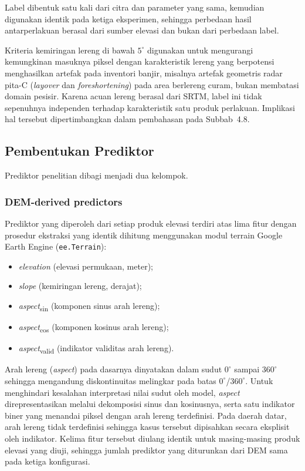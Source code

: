 \documentclass[12pt]{article}
\begin{document}
Label dibentuk satu kali dari citra dan parameter yang sama, kemudian
digunakan identik pada ketiga eksperimen, sehingga perbedaan hasil
antarperlakuan berasal dari sumber elevasi dan bukan dari perbedaan label.

Kriteria kemiringan lereng di bawah $5^{\circ}$ digunakan untuk mengurangi
kemungkinan masuknya piksel dengan karakteristik lereng yang berpotensi
menghasilkan artefak pada inventori banjir, misalnya artefak geometris
radar pita-C (\textit{layover} dan \textit{foreshortening}) pada area
berlereng curam, bukan membatasi domain pesisir.
Karena acuan lereng berasal dari SRTM, label ini tidak sepenuhnya independen
terhadap karakteristik satu produk perlakuan. Implikasi hal tersebut
dipertimbangkan dalam pembahasan pada Subbab~4.8.

\subsection{Pembentukan Prediktor}

Prediktor penelitian dibagi menjadi dua kelompok.

\subsubsection{DEM-derived predictors}

Prediktor yang diperoleh dari setiap produk elevasi terdiri atas lima fitur
dengan prosedur ekstraksi yang identik dihitung menggunakan modul terrain
Google Earth Engine (\texttt{ee.Terrain}):

\begin{itemize}
\item \textit{elevation} (elevasi permukaan, meter);
\item \textit{slope} (kemiringan lereng, derajat);
\item \textit{aspect}\textsubscript{sin} (komponen sinus arah lereng);
\item \textit{aspect}\textsubscript{cos} (komponen kosinus arah lereng);
\item \textit{aspect}\textsubscript{valid} (indikator validitas arah lereng).
\end{itemize}

Arah lereng (\textit{aspect}) pada dasarnya dinyatakan dalam sudut $0^{\circ}$
sampai $360^{\circ}$ sehingga mengandung diskontinuitas melingkar pada batas
$0^{\circ}$/$360^{\circ}$. Untuk menghindari kesalahan interpretasi nilai
sudut oleh model, \textit{aspect} direpresentasikan melalui dekomposisi
sinus dan kosinusnya, serta satu indikator biner yang menandai piksel dengan
arah lereng terdefinisi. Pada daerah datar, arah lereng tidak terdefinisi
sehingga kasus tersebut dipisahkan secara eksplisit oleh indikator. Kelima fitur tersebut
diulang identik untuk masing-masing produk elevasi yang diuji, sehingga jumlah
prediktor yang diturunkan dari DEM sama pada ketiga konfigurasi.
\end{document}
